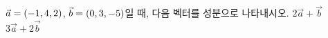 $\vec{a}=(-1{,}\mkern3mu\mathopen{}4{,}\mkern3mu\mathopen{}2)$, $\vec{b}=(0{,}\mkern3mu\mathopen{}3{,}\mkern3mu\mathopen{}-5)$일 때, 다음 벡터를 성분으로 나타내시오.
 $2\vec{a}+\vec{b}$
 $3\vec{a}+2\vec{b}$
